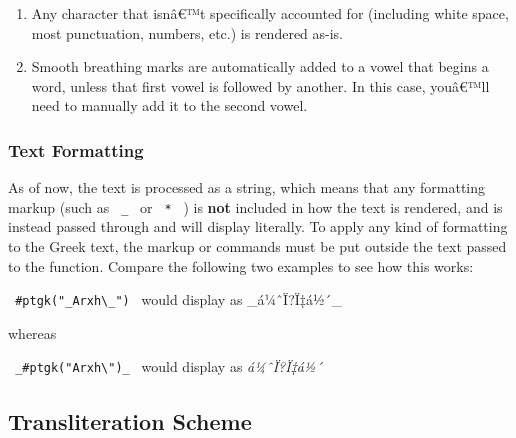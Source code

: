 \begin{enumerate}
\tightlist
\item
  Any character that isnâ€™t specifically accounted for (including white
  space, most punctuation, numbers, etc.) is rendered as-is.
\item
  Smooth breathing marks are automatically added to a vowel that begins
  a word, unless that first vowel is followed by another. In this case,
  youâ€™ll need to manually add it to the second vowel.
\end{enumerate}

\subsubsection{Text Formatting}\label{text-formatting}

As of now, the text is processed as a string, which means that any
formatting markup (such as \texttt{\ \_\ } or \texttt{\ *\ } ) is
\textbf{not} included in how the text is rendered, and is instead passed
through and will display literally. To apply any kind of formatting to
the Greek text, the markup or commands must be put outside the text
passed to the function. Compare the following two examples to see how
this works:

\texttt{\ \#ptgk("\_Arxh\textbackslash{}\_")\ } would display as
\_á¼ˆÏ?Ï‡á½´\_

whereas

\texttt{\ \_\#ptgk("Arxh\textbackslash{}")\_\ } would display as
\emph{á¼ˆÏ?Ï‡á½´}

\subsection{Transliteration Scheme}\label{transliteration-scheme}

